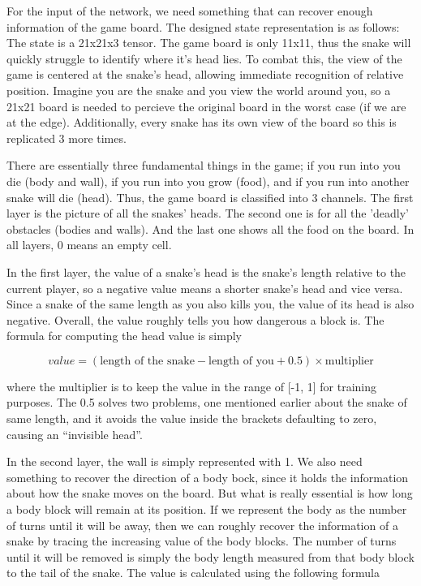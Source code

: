 \documentclass{article}
\begin{document}
\FloatBarrier

For the input of the network, we need something that can recover enough
information of the game board. The designed state representation is as
follows: The state is a 21x21x3 tensor. The game board is only 11x11, thus the
snake will quickly struggle to identify where it's head lies. To combat this,
the view of the game is centered at the snake’s head, allowing immediate
recognition of relative position. Imagine you are the snake and you view the
world around you, so a 21x21 board is needed to percieve the original board in
the worst case (if we are at the edge). Additionally, every snake has
its own view of the board so this is replicated 3 more times.

There are essentially three fundamental things in the game; if you run into you
die (body and wall), if you run into you grow (food), and if you run into
another snake will die (head). Thus, the game board is classified into 3
channels. The first layer is the picture of all the snakes’ heads. The second
one is for all the 'deadly' obstacles (bodies and walls). And the last one shows
all the food on the board. In all layers, 0 means an empty cell.

In the first layer, the value of a snake’s head is the snake’s length relative
to the current player, so a negative value means a shorter snake’s head and vice
versa. Since a snake of the same length as you also kills you, the value of its
head is also negative. Overall, the value roughly tells you how dangerous a
block is. The formula for computing the head value is simply

\begin{equation}
  value = (\text{length of the snake}-\text{length of you}+0.5) \times \text{multiplier}
\end{equation}

where the multiplier is to keep the value in the range of [-1, 1] for training
purposes. The 0.5 solves two problems, one mentioned earlier about the snake of
same length, and it avoids the value inside the brackets defaulting to zero, causing an
“invisible head”.

In the second layer, the wall is simply represented with 1. We also need
something to recover the direction of a body bock, since it holds the
information about how the snake moves on the board. But what is really essential
is how long a body block will remain at its position. If we represent the body
as the number of turns until it will be away, then we can roughly recover the
information of a snake by tracing the increasing value of the body blocks. The
number of turns until it will be removed is simply the body length measured from
that body block to the tail of the snake. The value is calculated using the
following formula
\end{document}
